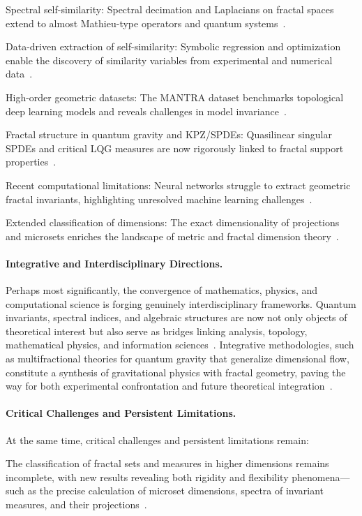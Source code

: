 \documentclass[sigconf]{acmart}
\begin{document}
Spectral self-similarity: Spectral decimation and Laplacians on fractal spaces extend to almost Mathieu-type operators and quantum systems~\cite{ref54}.

Data-driven extraction of self-similarity: Symbolic regression and optimization enable the discovery of similarity variables from experimental and numerical data~\cite{ref65}.

High-order geometric datasets: The MANTRA dataset benchmarks topological deep learning models and reveals challenges in model invariance~\cite{ref26}.

Fractal structure in quantum gravity and KPZ/SPDEs: Quasilinear singular SPDEs and critical LQG measures are now rigorously linked to fractal support properties~\cite{ref94,ref81}.

Recent computational limitations: Neural networks struggle to extract geometric fractal invariants, highlighting unresolved machine learning challenges~\cite{ref44,ref26}.

Extended classification of dimensions: The exact dimensionality of projections and microsets enriches the landscape of metric and fractal dimension theory~\cite{ref69,ref72}.

\paragraph{Integrative and Interdisciplinary Directions.}

Perhaps most significantly, the convergence of mathematics, physics, and computational science is forging genuinely interdisciplinary frameworks. Quantum invariants, spectral indices, and algebraic structures are now not only objects of theoretical interest but also serve as bridges linking analysis, topology, mathematical physics, and information sciences~\cite{ref65,ref92}. Integrative methodologies, such as multifractional theories for quantum gravity that generalize dimensional flow, constitute a synthesis of gravitational physics with fractal geometry, paving the way for both experimental confrontation and future theoretical integration~\cite{ref6}.

\paragraph{Critical Challenges and Persistent Limitations.}

At the same time, critical challenges and persistent limitations remain:

The classification of fractal sets and measures in higher dimensions remains incomplete, with new results revealing both rigidity and flexibility phenomena---such as the precise calculation of microset dimensions, spectra of invariant measures, and their projections~\cite{ref76,ref100,ref69,ref72}.
\end{document}
